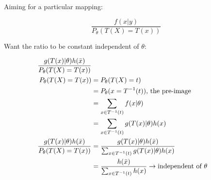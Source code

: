 \documentclass[11pt,letterpaper,titlepage]{article}
\begin{document}
\begin{itemize}
    Aiming for a particular mapping:
    
    \begin{equation*}
        \frac{f(x|y)}{P_{\theta}(T(X) = T(x))}
    \end{equation*}
    
    Want the ratio to be constant independent of $\theta$:
    
    \begin{equation*}
        \begin{aligned}
            \frac{g(T(x)|\theta)h(\Bar{x})}{P_{\theta}(T(X) = T(x))} \\
            P_{\theta}(T(X) = T(x)) &= P_{\theta}(T(X) = t) \\
            &= P_{\theta}(x = T^{-1}(t)) \text{, the pre-image} \\
            &= \sum_{x \in T^{-1}(t)} f(x|\theta) \\
            &= \sum_{x \in T^{-1}(t)} g(T(x)|\theta) h(x) \\
            \frac{g(T(x)|\theta)h(\Bar{x})}{P_{\theta}(T(X) = T(x))} &= \frac{g(T(x)|\theta)h(\Bar{x})}{\sum_{x \in T^{-1}(t)} g(T(x)|\theta) h(x)} \\
            &= \frac{h(\Bar{x})}{\sum_{x \in T^{-1}(t)} h(x)} \rightarrow \text{independent of } \theta
        \end{aligned}
    \end{equation*}
    
\end{itemize}
\end{document}
